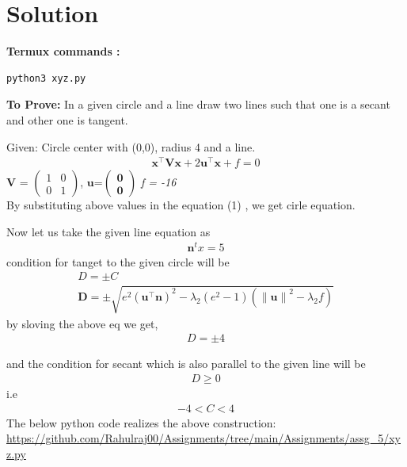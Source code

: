 \documentclass[10pt, a4paper]{article}
\providecommand{\norm}[1]{\left\lVert#1\right\rVert}
\providecommand{\brak}[1]{\ensuremath{\left(#1\right)}}
\let\vec\mathbf
\begin{document}
   \section{Solution}

\vspace{1mm}
\textbf{Termux commands :}
\begin{lstlisting}
python3 xyz.py
\end{lstlisting}


\vspace{.25 cm}
\textbf{To Prove:}
In a given circle and a line draw two lines such that one is a secant and other one is tangent. 

 Given:
Circle center with (0,0), radius 4 and a line. \\
\begin{align}
\vec{x}^{\top}\vec{V}\vec{x}+2\vec{u}^{\top}\vec{x}+f=0
\end{align}	
$\vec{V}$ = $\begin{pmatrix}
 1 & 0\\
 0 & 1
 \end{pmatrix}$,
 $\vec{u}$=$\vec{\begin{pmatrix}0 \\0 \end{pmatrix}}$
 \textit{f = -16}\\
 By substituting above values in the equation (1) ,
 we get cirle equation.

Now let us take the given line equation as\\
\begin{align}
\vec{n}^tx=5
\end{align}
condition for tanget to the given circle will be
\begin{align}
D = \pm C\\
\vec{D}= \pm \sqrt{e^2\brak{\vec{u}^{\top}\vec{n}}^2-\lambda_2\brak{e^2-1}\brak{\norm{\vec{u}}^2 - \lambda_2 f}}
\end{align}
by sloving the above eq we get,
\begin{align}
D = \pm 4 
\end{align}

and the condition for secant which is also parallel to the given line will be
\begin{align}
D \geq 0 
\end{align}
i.e 
\begin{align}
-4 < C < 4
\end{align}
\vspace{1mm}
The below python code realizes the above construction:	\\
\url{https://github.com/Rahulraj00/Assignments/tree/main/Assignments/assg_5/xyz.py}

\end{document}
